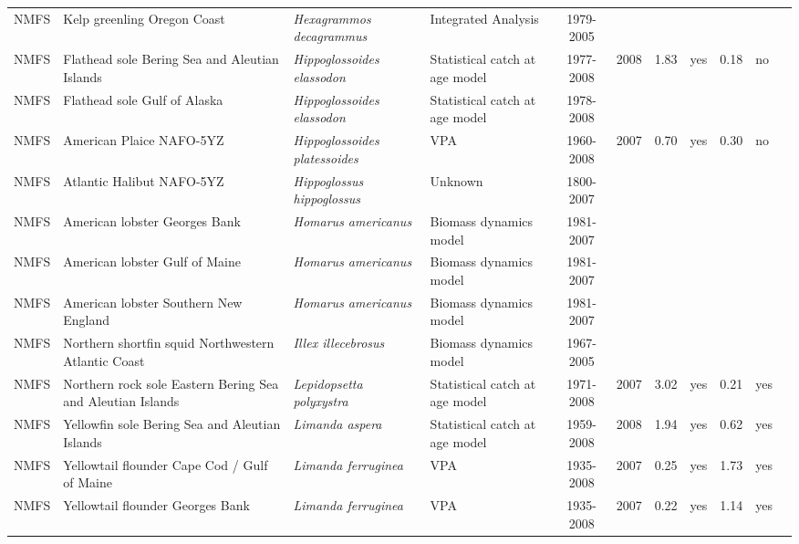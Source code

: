 \begin{longtable}{p{1.8cm}p{3.5cm}p{3.5cm}p{3cm}cccp{0.9cm}cp{0.9cm}c}
  NMFS & Kelp greenling Oregon Coast & \textit{Hexagrammos decagrammus} & Integrated Analysis & 1979-2005 &  &  &  &  &  & \cite{KelpGreenling_2005.pdf} \\ 
  NMFS & Flathead sole Bering Sea and Aleutian Islands & \textit{Hippoglossoides elassodon} & Statistical catch at age model & 1977-2008 & 2008 & 1.83 & yes & 0.18 & no & \cite{2008_SAFE_BSAIflathead.pdf} \\ 
  NMFS & Flathead sole Gulf of Alaska & \textit{Hippoglossoides elassodon} & Statistical catch at age model & 1978-2008 &  &  &  &  &  & \cite{2008_SAFE_GOAflathead.pdf} \\ 
  NMFS & American Plaice NAFO-5YZ & \textit{Hippoglossoides platessoides} & VPA & 1960-2008 & 2007 & 0.70 & yes & 0.30 & no & \cite{ .pdf} \\ 
  NMFS & Atlantic Halibut NAFO-5YZ & \textit{Hippoglossus hippoglossus} & Unknown & 1800-2007 &  &  &  &  &  & \cite{AtlanticHalibut5YZ2008.pdf .pdf} \\ 
  NMFS & American lobster Georges Bank & \textit{Homarus americanus} & Biomass dynamics model & 1981-2007 &  &  &  &  &  & \cite{2009-ASMFC-Am-Lob.pdf} \\ 
  NMFS & American lobster Gulf of Maine & \textit{Homarus americanus} & Biomass dynamics model & 1981-2007 &  &  &  &  &  & \cite{2009-ASMFC-Am-Lob.pdf} \\ 
  NMFS & American lobster Southern New England & \textit{Homarus americanus} & Biomass dynamics model & 1981-2007 &  &  &  &  &  & \cite{2009-ASMFC-Am-Lob.pdf} \\ 
  NMFS & Northern shortfin squid Northwestern Atlantic Coast & \textit{Illex illecebrosus} & Biomass dynamics model & 1967-2005 &  &  &  &  &  & \cite{scr06-46.pdf} \\ 
  NMFS & Northern rock sole Eastern Bering Sea and Aleutian Islands & \textit{Lepidopsetta polyxystra} & Statistical catch at age model & 1971-2008 & 2007 & 3.02 & yes & 0.21 & yes & \cite{2008_SAFE_BSAIrocksole.pdf} \\ 
  NMFS & Yellowfin sole Bering Sea and Aleutian Islands & \textit{Limanda aspera} & Statistical catch at age model & 1959-2008 & 2008 & 1.94 & yes & 0.62 & yes & \cite{AFSC-YSOLEBSAI-2008-Yellowfin sole BSAI.pdf} \\ 
  NMFS & Yellowtail flounder Cape Cod / Gulf of Maine & \textit{Limanda ferruginea} & VPA & 1935-2008 & 2007 & 0.25 & yes & 1.73 & yes & \cite{NMFS-CCGOM-Limandaferruginea-2008.pdf} \\ 
  NMFS & Yellowtail flounder Georges Bank & \textit{Limanda ferruginea} & VPA & 1935-2008 & 2007 & 0.22 & yes & 1.14 & yes & \cite{NMFS-GB-Limandaferruginea-2008.pdf} \\ 

\end{longtable}

